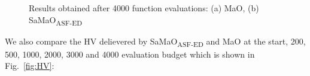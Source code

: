 \documentclass[onecolumn,10pt]{asme2ej}
\begin{document}
\begin{figure}[!htb]
	\centering    
	\caption{Results obtained after 4000 function evaluations: (a) MaO, (b) SaMaO\textsubscript{ASF-ED}}
	\label{fig:4000}
\end{figure}

\clearpage

We also compare the HV delievered by SaMaO\textsubscript{ASF-ED} and MaO at the start, 200, 500, 1000, 2000, 3000 and 4000 evaluation budget which is shown in Fig.~\ref{fig:HV}:
\end{document}
